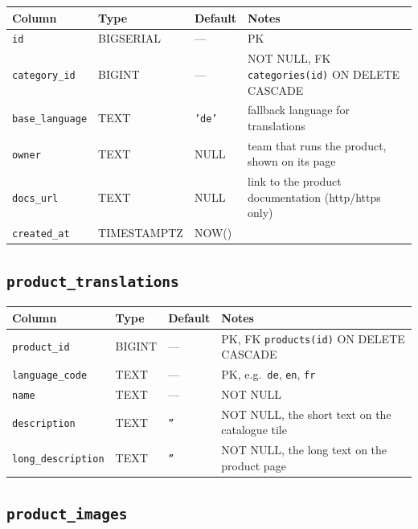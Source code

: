\documentclass[12pt,a4paper,twoside]{report}
\newcommand{\code}[1]{\texttt{#1}}
\begin{document}
\begin{table}[H]
  \centering\small
  \begin{tabular}{@{}llll@{}}
    \toprule
    \textbf{Column} & \textbf{Type} & \textbf{Default} & \textbf{Notes} \\
    \midrule
    \code{id}           & BIGSERIAL & ---  & PK \\
    \code{category\_id} & BIGINT    & ---  & NOT NULL, FK \textrightarrow{} \code{categories(id)} ON DELETE CASCADE \\
    \code{base\_language}& TEXT     & \code{'de'} & fallback language for translations \\
    \code{owner}        & TEXT      & NULL & team that runs the product, shown on its page \\
    \code{docs\_url}    & TEXT      & NULL & link to the product documentation (http/https only) \\
    \code{created\_at}  & TIMESTAMPTZ & NOW() & \\
    \bottomrule
  \end{tabular}
\end{table}

\subsection*{\texttt{product\_translations}}

\begin{table}[H]
  \centering\small
  \begin{tabular}{@{}llll@{}}
    \toprule
    \textbf{Column} & \textbf{Type} & \textbf{Default} & \textbf{Notes} \\
    \midrule
    \code{product\_id}    & BIGINT & --- & PK, FK \textrightarrow{} \code{products(id)} ON DELETE CASCADE \\
    \code{language\_code} & TEXT   & --- & PK, e.g.\ \code{de}, \code{en}, \code{fr} \\
    \code{name}           & TEXT   & --- & NOT NULL \\
    \code{description}    & TEXT   & \code{''} & NOT NULL, the short text on the catalogue tile \\
    \code{long\_description} & TEXT & \code{''} & NOT NULL, the long text on the product page \\
    \bottomrule
  \end{tabular}
\end{table}

\subsection*{\texttt{product\_images}}
\end{document}
